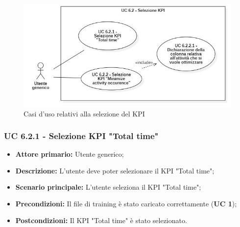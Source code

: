 \begin{figure}[H]
    \centering
    \includegraphics[scale=0.6]{immagini/usecase/cd4.JPG}
    \caption{Casi d'uso relativi alla selezione del KPI}
\end{figure}

\subsubsection{UC 6.2.1 - Selezione KPI "Total time"}
\begin{itemize}
	\item \textbf{Attore primario:} Utente generico;
	\item \textbf{Descrizione:} L'utente deve poter selezionare il KPI "Total time";
	\item \textbf{Scenario principale:} L'utente seleziona il KPI "Total time";
			
	\item \textbf{Precondizioni:} Il file di training è stato caricato correttamente (\textbf{UC 1});
	\item \textbf{Postcondizioni:} Il KPI "Total time" è stato selezionato.
\end{itemize}

%			

